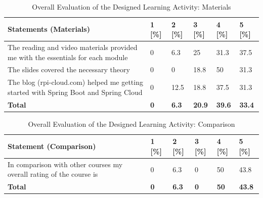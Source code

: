 \begin{table}[H]
\centering
\begin{tabular}{|p{9cm}|p{0.8cm}|p{0.8cm}|p{0.8cm}|p{0.8cm}|p{0.8cm}|}
\hline
\rowcolor[HTML]{EFEFEF} 
\textbf{Statements (Materials)}             & \textbf{1} [\%] & \textbf{2} [\%] & \textbf{3} [\%] & \textbf{4} [\%] & \textbf{5} [\%]   \\ \hline
The reading and video materials provided me with the essentials for each module		& 0 & 6.3 & 25 & 31.3 & 37.5    	 	\\ \hline
The slides covered the necessary theory		& 0 & 0 & 18.8 & 50 & 31.3    	 	\\ \hline
The blog (rpi-cloud.com) helped me getting started with Spring Boot and Spring Cloud		& 0 & 12.5 & 18.8 & 37.5 & 31.3    	 	\\ \hline
\rowcolor[HTML]{EFEFEF} 
\textbf{Total}             	& \textbf{0} & \textbf{6.3}  & \textbf{20.9}  & \textbf{39.6}  & \textbf{33.4}   \\ \hline
\end{tabular}
\caption{Overall Evaluation of the Designed Learning Activity: Materials}
\label{table:overallevaluationlearningactivitymaterials}
\end{table}



\begin{table}[H]
\centering
\begin{tabular}{|p{9cm}|p{0.8cm}|p{0.8cm}|p{0.8cm}|p{0.8cm}|p{0.8cm}|}
\hline
\rowcolor[HTML]{EFEFEF} 
\textbf{Statement (Comparison)}             & \textbf{1} [\%] & \textbf{2} [\%] & \textbf{3} [\%] & \textbf{4} [\%] & \textbf{5} [\%]   \\ \hline
In comparison with other courses my overall rating of the course is		  &  0 & 6.3 & 0 & 50 & 43.8    	 	\\ \hline
\rowcolor[HTML]{EFEFEF} 
\textbf{Total}             	& \textbf{0} & \textbf{6.3} & \textbf{0} & \textbf{50} & \textbf{43.8}   \\ \hline
\end{tabular}
\caption{Overall Evaluation of the Designed Learning Activity: Comparison}
\label{table:overallevaluationlearningactivitycomparison}
\end{table}

